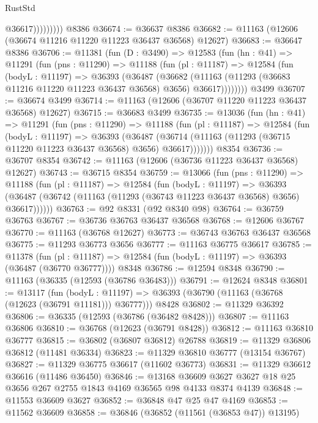 \begin{lexlean}{RustStd}
\begin{coremodule}
                      @36617)))))))))
    @8386
@36674 := @36637 @8386
@36682 := @11163 (@12606 (@36674 @11216 @11220 @11223 @36437 @36568) @12627)
@36683 := @36647 @8386
@36706 := @11381
    (fun (D : @3490) =>
    @12583
      (fun (hn : @41) =>
      @11291
        (fun (pns : @11290) =>
        @11188
          (fun (pl : @11187) =>
          @12584
            (fun (bodyL : @11197) =>
            @36393
              (@36487
                (@36682
                  (@11163 (@11293 (@36683 @11216 @11220 @11223 @36437 @36568) @3656) @36617))))))))
    @3499
@36707 := @36674 @3499
@36714 := @11163 (@12606 (@36707 @11220 @11223 @36437 @36568) @12627)
@36715 := @36683 @3499
@36735 := @13036
    (fun (hn : @41) =>
    @11291
      (fun (pns : @11290) =>
      @11188
        (fun (pl : @11187) =>
        @12584
          (fun (bodyL : @11197) =>
          @36393
            (@36487
              (@36714 (@11163 (@11293 (@36715 @11220 @11223 @36437 @36568) @3656) @36617)))))))
    @8354
@36736 := @36707 @8354
@36742 := @11163 (@12606 (@36736 @11223 @36437 @36568) @12627)
@36743 := @36715 @8354
@36759 := @13066
    (fun (pns : @11290) =>
    @11188
      (fun (pl : @11187) =>
      @12584
        (fun (bodyL : @11197) =>
        @36393 (@36487 (@36742 (@11163 (@11293 (@36743 @11223 @36437 @36568) @3656) @36617))))))
@36763 := @92 @8331 (@92 @8340 @98)
@36764 := @36759 @36763
@36767 := @36736 @36763 @36437 @36568
@36768 := @12606 @36767
@36770 := @11163 (@36768 @12627)
@36773 := @36743 @36763 @36437 @36568
@36775 := @11293 @36773 @3656
@36777 := @11163 @36775 @36617
@36785 := @11378
    (fun (pl : @11187) => @12584 (fun (bodyL : @11197) => @36393 (@36487 (@36770 @36777))))
    @8348
@36786 := @12594 @8348
@36790 := @11163 (@36335 (@12593 (@36786 @36483)))
@36791 := @12624 @8348
@36801 := @13117
    (fun (bodyL : @11197) => @36393 (@36790 (@11163 (@36768 (@12623 (@36791 @11181))) @36777)))
    @8428
@36802 := @11329 @36392
@36806 := @36335 (@12593 (@36786 (@36482 @8428)))
@36807 := @11163 @36806
@36810 := @36768 (@12623 (@36791 @8428))
@36812 := @11163 @36810 @36777
@36815 := @36802 (@36807 @36812) @26788
@36819 := @11329 @36806 @36812 (@11481 @36334)
@36823 := @11329 @36810 @36777 (@13154 @36767)
@36827 := @11329 @36775 @36617 (@11602 @36773)
@36831 := @11329 @36612 @36616 (@11486 @36450)
@36846 := @13168
    @36609
    @3627
    @3627
    @18
    @25
    @3656
    @267
    @2755
    @1843
    @4169
    @36565
    @98
    @4133
    @8374
    @4139
@36848 := @11553 @36609 @3627
@36852 := @36848 @47 @25 @47 @4169
@36853 := @11562 @36609
@36858 := @36846 (@36852 (@11561 (@36853 @47)) @13195)

\end{coremodule}
\end{lexlean}
